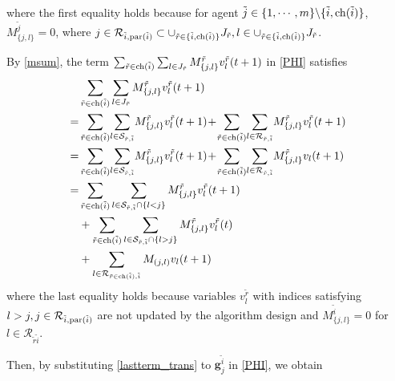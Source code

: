 \documentclass[journal]{IEEEtran}
\begin{document}
where the first equality holds because for agent $\tilde{j}\in \{1,\cdots,m\}\backslash\{\tilde{i},{\rm ch}(\tilde{i})\}$, $M_{\{j,l\}}^{\tilde{j}}=0$, where $j\in \mathcal{R}_{\tilde{i},{\rm par}(\tilde{i})}\subset  \cup_{\tilde{r}\in \{\tilde{i},{\rm ch}(\tilde{i})\}} J_{\tilde{r}}, l\in \cup_{\tilde{r}\in \{\tilde{i},{\rm ch}(\tilde{i})\}}J_{\tilde{r}}$.
\par By \eqref{msum}, the term $\sum_{\tilde{r}\in {\rm ch}(\tilde{i})}\sum_{l\in J_{\tilde{r}}} M_{\{j,l\}}^{\tilde{r}} v_{l}^{\tilde{r}}(t+1)$ in \eqref{PHI} satisfies
\begin{align}\label{lastterm_trans}
&\sum_{\tilde{r}\in {\rm ch}(\tilde{i})}\sum_{l\in J_{\tilde{r}}} M_{\{j,l\}}^{\tilde{r}} v_{l}^{\tilde{r}}(t+1) \notag\\
=&\sum_{\tilde{r}\in {\rm ch}(\tilde{i})}\!\sum_{l\in \mathcal{S}_{\tilde{r},\tilde{i}}}\! M_{\{j,l\}}^{\tilde{r}} v_{l}^{\tilde{r}}(t+1)\!+\!\sum_{\tilde{r}\in {\rm ch}(\tilde{i})}\!\sum_{l\in \mathcal{R}_{\tilde{r},\tilde{i}}}\! M_{\{j,l\}}^{\tilde{r}} v_{l}^{\tilde{r}}(t+1)\notag\\
=&\sum_{\tilde{r}\in {\rm ch}(\tilde{i})}\!\sum_{l\in \mathcal{S}_{\tilde{r},\tilde{i}}}\! M_{\{j,l\}}^{\tilde{r}} v_{l}^{\tilde{r}}(t+1)\!+\!\sum_{\tilde{r}\in {\rm ch}(\tilde{i})}\!\sum_{l\in \mathcal{R}_{\tilde{r},\tilde{i}}}\! M_{\{j,l\}}^{\tilde{r}} v_{l}(t+1)\notag\\
=&\sum_{\tilde{r}\in {\rm ch}(\tilde{i})}\sum_{l\in \mathcal{S}_{\tilde{r},\tilde{i}}\cap \{l<j\}} M_{\{j,l\}}^{\tilde{r}} v_{l}^{\tilde{r}}(t+1)\notag\\
&+\sum_{\tilde{r}\in {\rm ch}(\tilde{i})}\sum_{l\in \mathcal{S}_{\tilde{r},\tilde{i}}\cap \{l>j\}} M_{\{j,l\}}^{\tilde{r}} v_{l}^{\tilde{r}}(t)\notag\\
&+\sum_{l\in \mathcal{R}_{\tilde{r}\in {\rm ch}(\tilde{i}),\tilde{i}}} M_{(j,l)} v_{l}(t+1)
\end{align}
where the last equality holds because variables $v_l^{\tilde{r}}$ with indices satisfying $l>j,j\in \mathcal{R}_{\tilde{i},{\rm par}(\tilde{i})}$ are not updated by the algorithm design and $M^{\tilde{i}}_{\{j,l\}}=0$ for $l\in \mathcal{R}_{\tilde{r}{\tilde{i}}}$.
\par Then, by substituting \eqref{lastterm_trans} to $\mathbf{g}_j^{\tilde{i}}$ in \eqref{PHI}, we obtain
\end{document}

